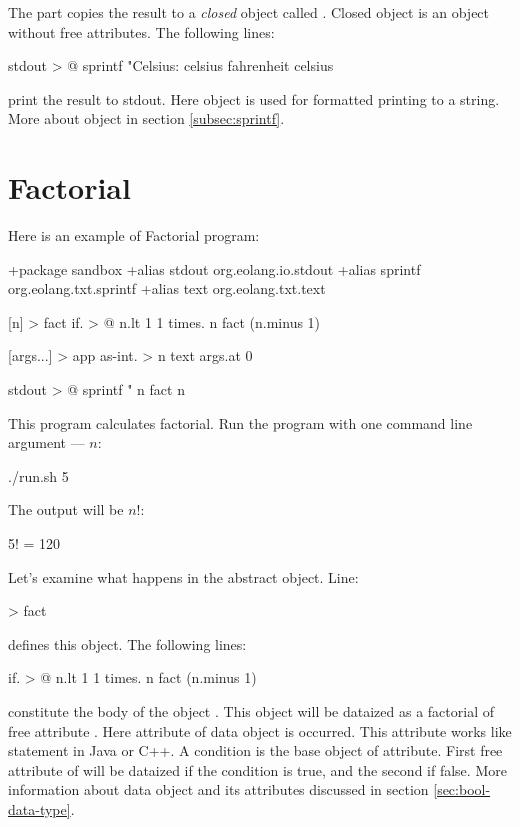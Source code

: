 \documentclass[12pt]{book}
\begin{document}
The  part copies the result to a \textit{closed} object called . Closed object is an object without free attributes. The following lines:
\begin{ffcode}
stdout > @
  sprintf
    "Celsius: %
    celsius
    fahrenheit celsius
\end{ffcode}
print the result to stdout. Here  object is used for formatted printing to a string. More about  object in section \ref{subsec:sprintf}.

\section{Factorial}

Here is an example of Factorial program:

\begin{ffcode}
+package sandbox
+alias stdout org.eolang.io.stdout
+alias sprintf org.eolang.txt.sprintf
+alias text org.eolang.txt.text

[n] > fact
  if. > @
    n.lt 1
    1
    times.
      n
      fact (n.minus 1)

[args...] > app
  as-int. > n
    text
      args.at 0

  stdout > @
    sprintf
      "%
      n
      fact n

\end{ffcode}

This program calculates factorial. Run the program with one command line argument —  $n$:
\begin{ffcode}
./run.sh 5
\end{ffcode}
The output will be $n!$:
\begin{ffcode}
5! = 120
\end{ffcode}

Let's examine what happens in the  abstract object. Line:
\begin{ffcode}
[n] > fact
\end{ffcode}
defines this object. The following lines:
\begin{ffcode}
if. > @
  n.lt 1
  1
  times.
    n
    fact (n.minus 1)
\end{ffcode}
constitute the body of the object . This object will be dataized as a factorial of free attribute . Here  attribute of  data object is occurred. This attribute works like  statement in Java or C++. A condition is the base object of  attribute. First free attribute of  will be dataized if the condition is true, and the second if false. More information about  data object and its attributes discussed in section \ref{sec:bool-data-type}.
\end{document}
